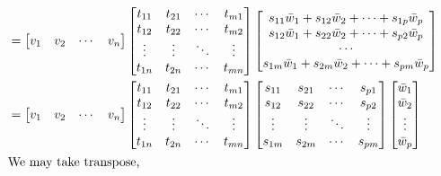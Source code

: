 \begin{commentary}
\begin{align*}
	& = \begin{bmatrix} v_1 & v_2 & \cdots & v_n  \end{bmatrix} \begin{bmatrix} t_{11} & t_{21} & \cdots & t_{m1} \\ t_{12} & t_{22} & \cdots & t_{m2} \\ \vdots & \vdots & \ddots & \vdots \\ t_{1n} & t_{2n} & \cdots & t_{mn} \end{bmatrix} \begin{bmatrix} s_{11}\bar{w}_1+s_{12}\bar{w}_2+\cdots+s_{1p}\bar{w}_p \\ s_{12}\bar{w}_1+s_{22}\bar{w}_2+\cdots+s_{p2}\bar{w}_p \\ \cdots \\ s_{1m}\bar{w}_1+ s_{2m}\bar{w}_2+\cdots+s_{pm}\bar{w}_p \end{bmatrix} \\
	& = \begin{bmatrix} v_1 & v_2 & \cdots & v_n  \end{bmatrix} \begin{bmatrix} t_{11} & t_{21} & \cdots & t_{m1} \\ t_{12} & t_{22} & \cdots & t_{m2} \\ \vdots & \vdots & \ddots & \vdots \\ t_{1n} & t_{2n} & \cdots & t_{mn} \end{bmatrix} \begin{bmatrix} s_{11} & s_{21} & \cdots & s_{p1} \\ s_{12} & s_{22} & \cdots & s_{p2} \\ \vdots & \vdots & \ddots & \vdots \\ s_{1m} & s_{2m} & \cdots & s_{pm} \end{bmatrix} \begin{bmatrix} \bar{w}_1 \\ \bar{w}_2 \\ \vdots \\ \bar{w}_p \end{bmatrix}\\
	\intertext{We may take transpose,}

\end{align*}
\end{commentary}
